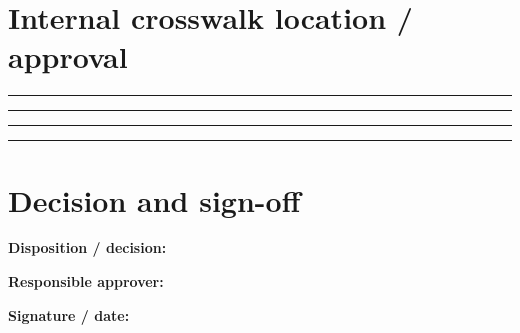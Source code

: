 \documentclass[10pt,letterpaper]{article}
\begin{document}
\section{Internal crosswalk location / approval}
\noindent\rule{\linewidth}{0.4pt}\par\vspace{16pt}
\noindent\rule{\linewidth}{0.4pt}\par\vspace{16pt}
\noindent\rule{\linewidth}{0.4pt}\par\vspace{16pt}
\noindent\rule{\linewidth}{0.4pt}\par\vspace{16pt}
\section{Decision and sign-off}
\noindent\textbf{Disposition / decision:}\quad\hrulefill\par\vspace{11pt}
\noindent\textbf{Responsible approver:}\quad\hrulefill\par\vspace{11pt}
\noindent\textbf{Signature / date:}\quad\hrulefill\par\vspace{11pt}
\end{document}
